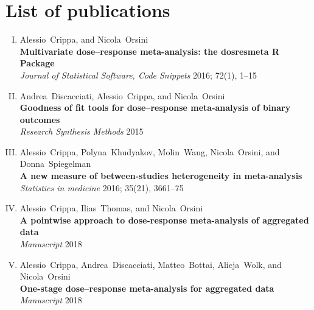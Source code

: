 %

\chapter*{List of publications}

\begin{enumerate}[I.]
\item Alessio~Crippa, and Nicola~Orsini \\ \textbf{Multivariate dose--response meta-analysis: the dosresmeta R Package} \\ \textit{Journal of Statistical Software, Code Snippets} 2016; 72(1), 1--15
\item Andrea~Discacciati, Alessio~Crippa, and Nicola~Orsini \\ \textbf{Goodness of fit tools for dose--response meta-analysis of binary outcomes} \\ \textit{Research Synthesis Methods} 2015
\item Alessio~Crippa, Polyna~Khudyakov, Molin~Wang, Nicola~Orsini, and Donna~Spiegelman \\ \textbf{A new measure of between-studies heterogeneity in meta-analysis} \\ \textit{Statistics in medicine} 2016; 35(21), 3661--75
\item Alessio~Crippa, Ilias~Thomas, and Nicola~Orsini \\ \textbf{A pointwise approach to dose-response meta-analysis of aggregated data} \\ \textit{Manuscript} 2018
\item Alessio~Crippa, Andrea~Discacciati, Matteo~Bottai, Alicja~Wolk, and Nicola~Orsini \\ \textbf{One-stage dose--response meta-analysis for aggregated data} \\ \textit{Manuscript} 2018
\end{enumerate}
\vspace{1.5cm}

